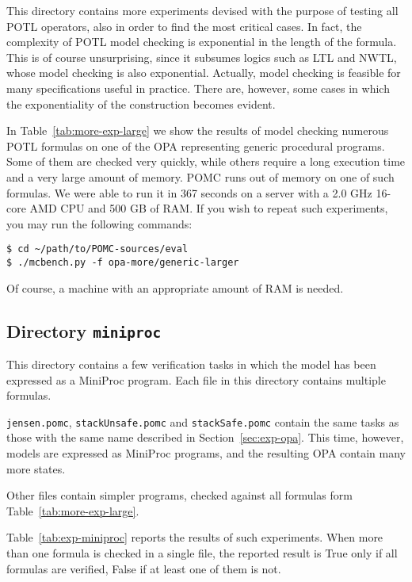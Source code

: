 \documentclass[9pt,a4paper]{article}
\begin{document}
This directory contains more experiments devised with the purpose of
testing all POTL operators, also in order to find the most critical
cases.  In fact, the complexity of POTL model checking is exponential
in the length of the formula.  This is of course unsurprising, since
it subsumes logics such as LTL and NWTL, whose model checking is also
exponential.  Actually, model checking is feasible for many
specifications useful in practice.  There are, however, some cases in
which the exponentiality of the construction becomes evident.

In Table~\ref{tab:more-exp-large} we show the results of model checking numerous
POTL formulas on one of the OPA representing generic procedural programs.
Some of them are checked very quickly,
while others require a long execution time and a very large amount of
memory. POMC runs out of memory on one of such formulas.
We were able to run it in 367 seconds on a server with
a 2.0 GHz 16-core AMD CPU and 500 GB of RAM.
If you wish to repeat such experiments, you may run the following
commands:
\begin{verbatim}
$ cd ~/path/to/POMC-sources/eval
$ ./mcbench.py -f opa-more/generic-larger
\end{verbatim}
Of course, a machine with an appropriate amount of RAM is needed.


\subsection{Directory \texttt{miniproc}}

This directory contains a few verification tasks in which the model
has been expressed as a MiniProc program.
Each file in this directory contains multiple formulas.

\texttt{jensen.pomc}, \texttt{stackUnsafe.pomc} and \texttt{stackSafe.pomc}
contain the same tasks as those with the same name described in Section~\ref{sec:exp-opa}.
This time, however, models are expressed as MiniProc programs, and the resulting
OPA contain many more states.

Other files contain simpler programs, checked against all formulas form
Table~\ref{tab:more-exp-large}.

Table~\ref{tab:exp-miniproc} reports the results of such experiments.
When more than one formula is checked in a single file, the reported result is True
only if all formulas are verified, False if at least one of them is not.
\end{document}
